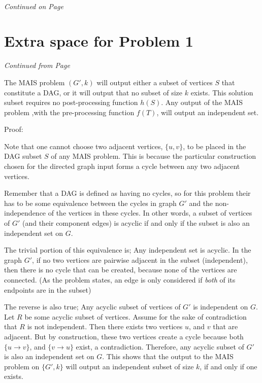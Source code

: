 \documentclass[11pt]{article}
\begin{document}
\label{pg:end-of-p5}

\paragraph{} \emph{Continued on Page \pageref{pg:p5-continuation}}

\newpage
  
\section*{Extra space for Problem 1}
\emph{Continued from Page \pageref{pg:end-of-p1}}


\label{pg:p1-continuation}

  The MAIS problem $(G',k)$ will output either a subset of vertices $S$ that constitute
  a DAG, or it will output that no subset of size $k$ exists. This solution subset
  requires no post-processing function $h(S)$. Any output of the MAIS problem 
  ,with the pre-processing function $f(T)$, will output an independent set. 
  
  Proof: 

  Note that one cannot choose two adjacent vertices, $\{u,v\}$,
  to be placed in the DAG subset $S$ of any MAIS problem. 
  This is because the particular
  construction chosen for the directed graph input forms a cycle between any two
  adjacent vertices. 

  Remember that a DAG is defined as having no cycles, so for this problem
  their has to be some equivalence between the cycles in graph $G'$ and 
  the non-independence of the vertices in these cycles. In other words, 
  a subset of vertices of $G'$ (and their component edges) is acyclic if and only if the subset
  is also an independent set on $G$. 
  
  The trivial portion of this equivalence is; Any independent set is acyclic. 
  In the graph $G'$, if no two vertices are pairwise adjacent in the subset (independent),
  then there is no cycle that can be created, because none of the vertices are connected. 
  (As the problem states, an edge is only considered if \emph{both} of its endpoints are in the subset)
  
  The reverse is also true; Any acyclic subset of vertices of $G'$ is independent on $G$.
  Let $R$ be some acyclic subset of vertices. Assume for the sake of contradiction that $R$ is not independent. 
  Then there exists two vertices $u$, and $v$ that are adjacent. But by construction, these two 
  vertices create a cycle because both  $\{u \rightarrow v\}$, and $\{v \rightarrow u\}$ exist, a contradiction.
  Therefore, any acyclic subset of $G'$ is also an independent set on $G$. This shows
  that the output to the MAIS problem on $\{G',k\}$ will output an independent subset of size $k$,
  if and only if one exists.
   
\end{document}
